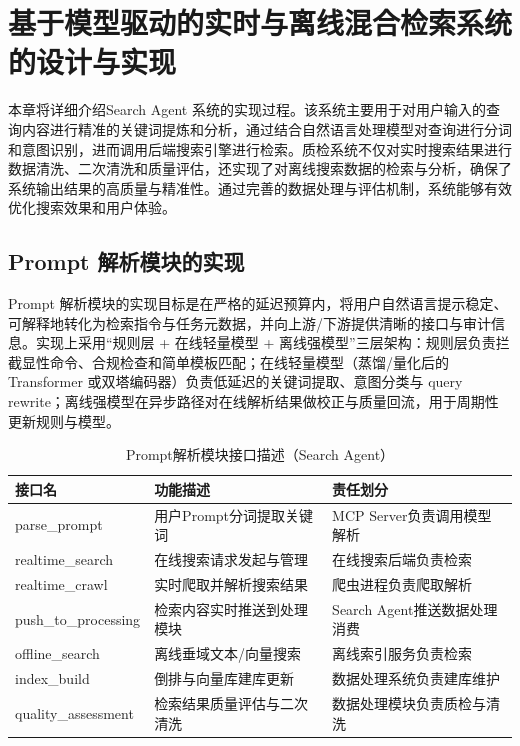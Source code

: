 \chapter{基于模型驱动的实时与离线混合检索系统的设计与实现}
本章将详细介绍Search Agent 系统的实现过程。该系统主要用于对用户输入的查询内容进行精准的关键词提炼和分析，通过结合自然语言处理模型对查询进行分词和意图识别，进而调用后端搜索引擎进行检索。质检系统不仅对实时搜索结果进行数据清洗、二次清洗和质量评估，还实现了对离线搜索数据的检索与分析，确保了系统输出结果的高质量与精准性。通过完善的数据处理与评估机制，系统能够有效优化搜索效果和用户体验。
\section{Prompt 解析模块的实现} 
Prompt 解析模块的实现目标是在严格的延迟预算内，将用户自然语言提示稳定、可解释地转化为检索指令与任务元数据，并向上游/下游提供清晰的接口与审计信息。实现上采用“规则层 + 在线轻量模型 + 离线强模型”三层架构：规则层负责拦截显性命令、合规检查和简单模板匹配；在线轻量模型（蒸馏/量化后的 Transformer 或双塔编码器）负责低延迟的关键词提取、意图分类与 query rewrite；离线强模型在异步路径对在线解析结果做校正与质量回流，用于周期性更新规则与模型。
\begin{table}[H]
\centering
\caption{Prompt解析模块接口描述（Search Agent）}
\label{tab:prompt-parsing-interfaces}
{\renewcommand{\arraystretch}{0.7}
\begin{tabular}{p{3cm} p{5cm} p{5cm}}
\hline
接口名 & 功能描述 & 责任划分 \\
\hline
parse\_prompt & 用户Prompt分词提取关键词 & MCP Server负责调用模型解析 \\ \hline
realtime\_search & 在线搜索请求发起与管理 & 在线搜索后端负责检索 \\ \hline
realtime\_crawl & 实时爬取并解析搜索结果 & 爬虫进程负责爬取解析 \\ \hline
push\_to\_processing & 检索内容实时推送到处理模块 & Search Agent推送数据处理消费 \\ \hline
offline\_search & 离线垂域文本/向量搜索 & 离线索引服务负责检索 \\ \hline
index\_build & 倒排与向量库建库更新 & 数据处理系统负责建库维护 \\ \hline
quality\_assessment & 检索结果质量评估与二次清洗 & 数据处理模块负责质检与清洗 \\ \hline
\end{tabular}
}
\end{table}

